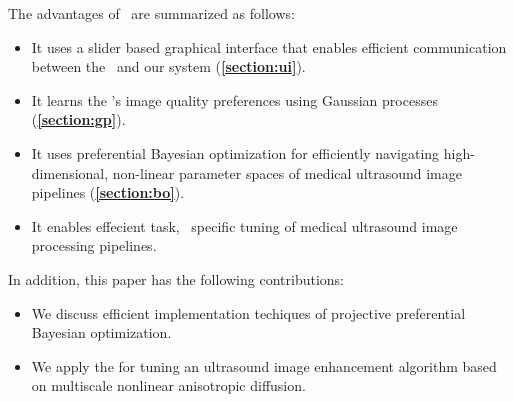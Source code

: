 The advantages of \usdg~are summarized as follows:
\begin{itemize}
  \item It uses a slider based graphical interface that enables efficient communication between the \user~and our system (\textbf{\cref{section:ui}}).
  \item It learns the \user's image quality preferences using Gaussian processes (\textbf{\cref{section:gp}}).
  \item It uses preferential Bayesian optimization for efficiently navigating high-dimensional, non-linear parameter spaces of medical ultrasound image pipelines (\textbf{\cref{section:bo}}).
  \item It enables effecient task, \user~specific tuning of medical ultrasound image processing pipelines.
\end{itemize}

In addition, this paper has the following contributions:
\begin{itemize}
  \item We discuss efficient implementation techiques of projective preferential Bayesian optimization.
  \item We apply the \usdg for tuning an ultrasound image enhancement algorithm based on multiscale nonlinear anisotropic diffusion.

\end{itemize}

